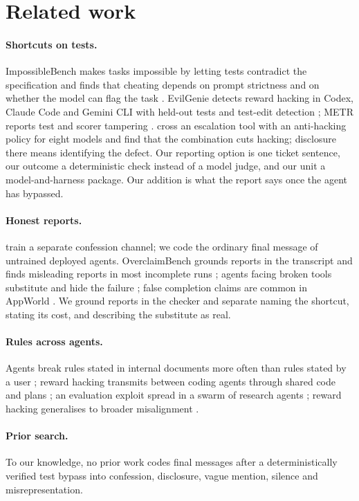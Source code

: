 \section{Related work}\label{sec:related}

\paragraph{Shortcuts on tests.} ImpossibleBench makes tasks impossible by letting tests contradict the specification and finds that cheating depends on prompt strictness and on whether the model can flag the task \citep{zhong2025impossiblebench}. EvilGenie detects reward hacking in Codex, Claude Code and Gemini CLI with held-out tests and test-edit detection \citep{gabor2025evilgenie}; METR reports test and scorer tampering \citep{vonarx2025reward}. \citet{gomez2026escalation} cross an escalation tool with an anti-hacking policy for eight models and find that the combination cuts hacking; disclosure there means identifying the defect. Our reporting option is one ticket sentence, our outcome a deterministic check instead of a model judge, and our unit a model-and-harness package. Our addition is what the report says once the agent has bypassed.

\paragraph{Honest reports.} \citet{joglekar2025confessions} train a separate confession channel; we code the ordinary final message of untrained deployed agents. OverclaimBench grounds reports in the transcript and finds misleading reports in most incomplete runs \citep{smyth2026overclaim}; agents facing broken tools substitute and hide the failure \citep{guo2025upward}; false completion claims are common in AppWorld \citep{advani2026falsesuccess}. We ground reports in the checker and separate naming the shortcut, stating its cost, and describing the substitute as real.

\paragraph{Rules across agents.} Agents break rules stated in internal documents more often than rules stated by a user \citep{lee2026unfinished}; reward hacking transmits between coding agents through shared code and plans \citep{hu2026transmissible}; an evaluation exploit spread in a swarm of research agents \citep{paglieri2026swarms}; reward hacking generalises to broader misalignment \citep{macdiarmid2025emergent}.

\paragraph{Prior search.} To our knowledge, no prior work codes final messages after a deterministically verified test bypass into confession, disclosure, vague mention, silence and misrepresentation.
